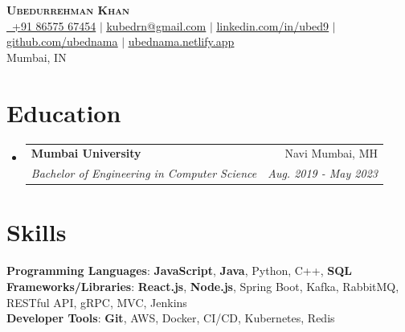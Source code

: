 \documentclass[a4paper,11pt]{article}
\makeatletter
\newcommand{\resumeSubheading}[4]{
  \vspace{-2pt}\item
    \begin{tabular*}{0.97\textwidth}[t]{l@{\extracolsep{\fill}}r}
      \textbf{#1} & #2 \\
      \textit{\small#3} & \textit{\small #4} \\
    \end{tabular*}\vspace{-7pt}
}
\makeatother
\begin{document}
\begin{center}
    \textbf{\Huge \scshape Ubedurrehman Khan} \\ \vspace{1pt}
    \small \href{tel:+918657567454}{ \ +91 86575 67454} $|$ \href{mailto:kubedrn@gmail.com}{\underline{kubedrn@gmail.com}} $|$ 
    \href{https://linkedin.com/in/ubed9}{\underline{linkedin.com/in/ubed9}} $|$
    \href{https://github.com/ubednama}{\underline{github.com/ubednama}} $|$
    \href{https://ubednama.netlify.app/}{\underline{ubednama.netlify.app}}\\[4pt]
    Mumbai, IN
\end{center}


\section{Education}
  \begin{itemize}[leftmargin=0.15in, label={}]
    \resumeSubheading
      {Mumbai University}{Navi Mumbai, MH}
      {Bachelor of Engineering in Computer Science}{Aug. 2019 - May 2023}
  \end{itemize}

\noindent\section*{Skills}
 \begin{itemize}[leftmargin=0.15in, label={}]
    \small{\item{
     \textbf{Programming Languages}{: \textbf{JavaScript}, \textbf{Java}, Python, C++, \textbf{SQL}} \\
     \textbf{Frameworks/Libraries}{: \textbf{React.js}, \textbf{Node.js}, Spring Boot, Kafka, RabbitMQ, RESTful API, gRPC, MVC, Jenkins} \\
     \textbf{Developer Tools}{: \textbf{Git}, AWS, Docker, CI/CD, Kubernetes, Redis}
    }}
 \end{itemize}

\vspace{-7pt}

\end{document}
